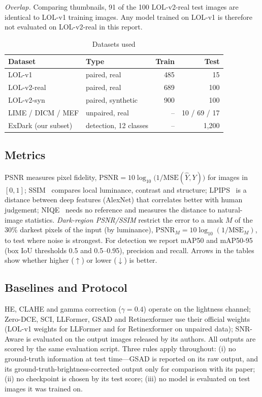 \documentclass[journal]{IEEEtran}
\begin{document}
\emph{Overlap.} Comparing thumbnails, 91 of the 100 LOL-v2-real test images are identical to LOL-v1 training images.
Any model trained on LOL-v1 is therefore not evaluated on LOL-v2-real in this report.

\begin{table}[t]
\centering
\caption{Datasets used}
\label{tab:data}
\begin{tabular}{l l r r}
\toprule
Dataset & Type & Train & Test \\
\midrule
LOL-v1 & paired, real & 485 & 15 \\
LOL-v2-real & paired, real & 689 & 100 \\
LOL-v2-syn & paired, synthetic & 900 & 100 \\
LIME / DICM / MEF & unpaired, real & -- & 10 / 69 / 17 \\
ExDark (our subset) & detection, 12 classes & -- & 1,200 \\
\bottomrule
\end{tabular}
\end{table}

\subsection{Metrics}
PSNR measures pixel fidelity, $\mathrm{PSNR}=10\log_{10}\bigl(1/\mathrm{MSE}(\hat{Y},Y)\bigr)$ for images in $[0,1]$;
SSIM~\cite{wang2004ssim} compares local luminance, contrast and structure; LPIPS~\cite{zhang2018lpips} is a distance
between deep features (AlexNet) that correlates better with human judgement; NIQE~\cite{mittal2013niqe} needs no
reference and measures the distance to natural-image statistics. \emph{Dark-region PSNR/SSIM} restrict the error to a
mask $M$ of the 30\% darkest pixels of the input (by luminance), $\mathrm{PSNR}_M=10\log_{10}(1/\mathrm{MSE}_M)$, to test
where noise is strongest. For detection we report mAP50 and mAP50-95 (box IoU thresholds 0.5 and 0.5--0.95),
precision and recall. Arrows in the tables show whether higher ($\uparrow$) or lower ($\downarrow$) is better.

\subsection{Baselines and Protocol}
HE, CLAHE and gamma correction ($\gamma=0.4$) operate on the lightness channel; Zero-DCE, SCI, LLFormer, GSAD and
Retinexformer use their official weights (LOL-v1 weights for LLFormer and for Retinexformer on unpaired data);
SNR-Aware is evaluated on the output images released by its authors. All outputs are scored by the same
evaluation script. Three rules apply throughout: (i) no ground-truth information at test time---GSAD is reported on
its raw output, and its ground-truth-brightness-corrected output only for comparison with its paper; (ii) no
checkpoint is chosen by its test score; (iii) no model is evaluated on test images it was trained on.
\end{document}
